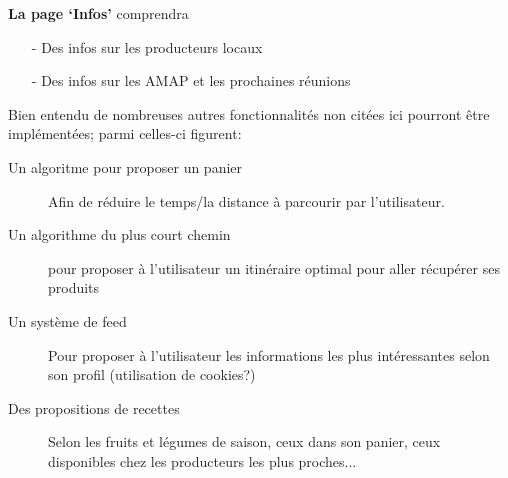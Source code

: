 \textbf{La page ‘Infos’} comprendra
\begin{itemize}
	\item[-] Des infos sur les producteurs locaux
	\item[-] Des infos sur les AMAP et les prochaines réunions
\end{itemize}

Bien entendu de nombreuses autres fonctionnalités non citées ici pourront être implémentées; parmi celles-ci figurent:
\begin{description}
   \item[Un algoritme pour proposer un panier] Afin de réduire le temps/la distance à parcourir par l'utilisateur.
   \item[Un algorithme du plus court chemin] pour proposer à l'utilisateur un itinéraire optimal pour aller récupérer ses produits 
   \item[Un système de feed] Pour proposer à l'utilisateur les informations les plus intéressantes selon son profil (utilisation de cookies?)
   \item[Des propositions de recettes] Selon les fruits et légumes de saison, ceux dans son panier, ceux disponibles chez les producteurs les plus proches...
\end{description}
